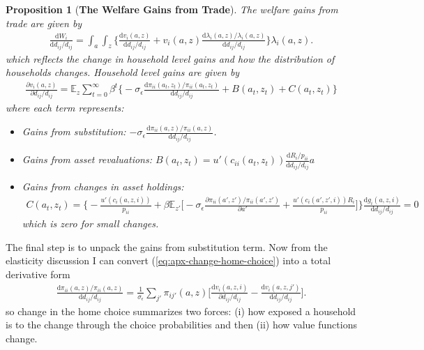 \documentclass[12pt,pdftex]{article}
\newtheorem{prp}{Proposition}
\begin{document}
\begin{onehalfspacing}
\begin{prp}[\textbf{The Welfare Gains from Trade}] \label{apx-prp:gains-trade} The welfare gains from trade are given by
{\footnotesize
\begin{align}
\frac{\mathrm{d} W_{i}}{\mathrm{d} d_{ij} / d_{ij}} = \int_{a}\int_{z}  \bigg \{ \frac{\mathrm{d} v_i(a, z)}{\mathrm{d} d_{ij} / d_{ij}}  + v_{i}(a,z) \frac{\mathrm{d} \lambda_{i}(a,z)/ \lambda_{i}(a,z)}{\mathrm{d} d_{ij} / d_{ij}}  \bigg \} \lambda_{i}(a,z).
\nonumber
\end{align}
}which reflects the change in household level gains and how the distribution of households changes. Household level gains are given by
{\footnotesize
\begin{align}
\nonumber
\frac{\partial v_i(a, z)}{\partial d_{ij} / d_{ij}} = \mathbb{E}_{z} \sum_{t = 0}^{\infty} \beta^{t} \bigg \{ -\sigma_{\epsilon} \frac{\mathrm{d} \pi_{ii}(a_{t},z_{t}) / \pi_{ii}(a_{t},z_{t})}{\mathrm{d}d_{ij} / d_{ij}} + B(a_{t},z_{t}) + C(a_{t},z_{t}) \bigg \}
\end{align}
}where each term represents:
\begin{itemize}
\item Gains from substitution: $-\sigma_{\epsilon} \frac{\mathrm{d} \pi_{ii}(a,z) / \pi_{ii}(a,z)}{\mathrm{d}d_{ij} / d_{ij}}$.

\item Gains from asset revaluations: $B(a_{t},z_{t}) = u'(c_{ii}(a_{t},z_{t}))\frac{\mathrm{d} R_{i}/p_{ii}}{\mathrm{d} d_{ij} / d_{ij}}a$

\item Gains from changes in asset holdings:
{\footnotesize
\begin{align}
\nonumber
C(a_{t},z_{t}) = \bigg \{- \frac{u'(c_{i}(a,z,i))}{p_{ii}} + \beta \mathbb{E}_{z'} \bigg [-\sigma_{\epsilon} \frac{\partial \pi_{ii}(a',z') / \pi_{ii}(a',z')}{\partial a'} + \frac{u'(c_{i}(a',z',i))R_{i}}{p_{ii}} \bigg ] \bigg \}\frac{\mathrm{d} g_{i}(a,z,i)}{\mathrm{d} d_{ij} / d_{ij}} = 0
\end{align}}
which is zero for small changes.
\end{itemize}
\end{prp}


The final step is to unpack the gains from substitution term. Now from the elasticity discussion I can convert (\ref{eq:apx-change-home-choice}) into a total derivative form
\begin{align}
\frac{\mathrm{d} \pi_{ii}(a,z) / \pi_{ii}(a,z) }{\mathrm{d} d_{ij} / d_{ij}} = \frac{1}{\sigma_{\epsilon}} \sum_{j'} \pi_{ij'}(a,z) \bigg[ \frac{\mathrm{d} v_{i}(a,z,i)}{\partial d_{ij}/d_{ij}} - \frac{\mathrm{d} v_{i}(a,z,j')}{\mathrm{d} d_{ij}/d_{ij}} \bigg].
\label{apx-eq:homechoice-total}
\end{align}
so change in the home choice summarizes two forces: (i) how exposed a household is to the change through the choice probabilities and then (ii) how value functions change.


\end{onehalfspacing}
\end{document}

